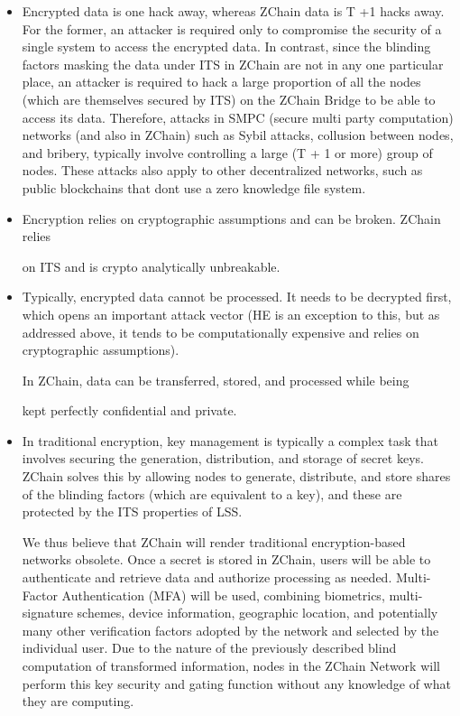 \documentclass[11pt]{article}
\begin{document}
\begin{itemize}
  \item Encrypted data is one hack away, whereas ZChain data is T +1 hacks away. For the former, an attacker is required only to compromise the security of a single system to access the encrypted data. In contrast, since the blinding factors masking the data under ITS in ZChain are not in any one particular place, an attacker is required to hack a large proportion of all the nodes (which are themselves secured by ITS) on the ZChain Bridge to be able to access its data. Therefore, attacks in SMPC (secure multi party computation) networks (and also in ZChain) such as Sybil attacks, collusion between nodes, and bribery, typically involve controlling a large (T + 1 or more) group of nodes. These attacks also apply to other decentralized networks, such as public blockchains that dont use a zero knowledge file system.
  \item Encryption relies on cryptographic assumptions and can be broken. ZChain relies

on ITS and is crypto analytically unbreakable.

  \item Typically, encrypted data cannot be processed. It needs to be decrypted first, which opens an important attack vector (HE is an exception to this, but as addressed above, it tends to be computationally expensive and relies on cryptographic assumptions).

In ZChain, data can be transferred, stored, and processed while being


kept perfectly confidential and private.

  \item In traditional encryption, key management is typically a complex task that involves securing the generation, distribution, and storage of secret keys. ZChain solves this by allowing nodes to generate, distribute, and store shares of the blinding factors (which are equivalent to a key), and these are protected by the ITS properties of LSS.

We thus believe that ZChain will render traditional encryption-based networks obsolete. Once a secret is stored in ZChain, users will be able to authenticate and retrieve data and authorize processing as needed. Multi-Factor Authentication (MFA) will be used, combining biometrics, multi-signature schemes, device information, geographic location, and potentially many other verification factors adopted by the network and selected by the individual user. Due to the nature of the previously described blind computation of transformed information, nodes in the ZChain Network will perform this key security and gating function without any knowledge of what they are computing.

\end{itemize}
\end{document}
